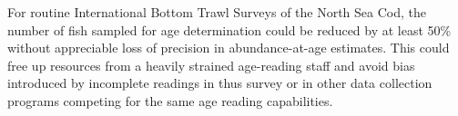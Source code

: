 \documentclass[a4paper 12pt]{article}
\numberwithin{equation}{section}
\begin{document}
For routine International Bottom Trawl Surveys of the North Sea Cod, the number of fish sampled for age determination could be reduced   by at least  50\% without appreciable loss of precision in abundance-at-age estimates.  This could free up resources from a heavily strained age-reading staff and avoid bias introduced by incomplete readings in thus survey or in other data 
collection programs competing for the same age reading capabilities.



\end{document}

